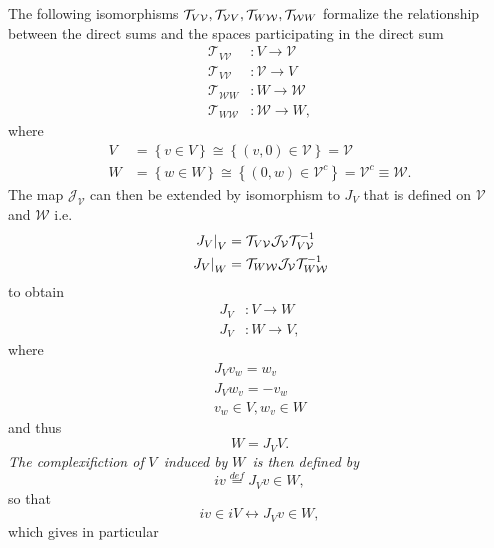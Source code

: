 \documentclass[aps,preprint]{revtex4}
\begin{document}
The following isomorphisms $\mathcal{T}_{V\mathcal{V}},\mathcal{T}_{\mathcal{%
V}V},\mathcal{T}_{W\mathcal{W}},\mathcal{T}_{\mathcal{W}W}$ formalize the
relationship between the direct sums and the spaces participating in the
direct sum 
\begin{align}
\mathcal{T}_{V\mathcal{V}} & :V\rightarrow\mathcal{V} \\
\mathcal{T}_{V\mathcal{V}} & :\mathcal{V}\rightarrow V \\
\mathcal{T}_{\mathcal{W}W} & :W\rightarrow\mathcal{W} \\
\mathcal{T}_{W\mathcal{W}} & :\mathcal{W}\rightarrow W,
\end{align}
where%
\begin{align}
V & =\left\{ v\in V\right\} \cong\left\{ \left( v,0\right) \in\mathcal{V}%
\right\} =\mathcal{V} \\
W & =\left\{ w\in W\right\} \cong\left\{ \left( 0,w\right) \in\mathcal{V}%
^{c}\right\} =\mathcal{V}^{c}\equiv\mathcal{W}.
\end{align}
The map $\mathcal{J}_{\mathcal{V}}$ can then be extended by isomorphism to $%
J_{V}$ that is defined on $\mathcal{V}$ and $\mathcal{W}$ i.e. 
\begin{align}
\left. J_{V}\right\vert _{V} & =\mathcal{T}_{V\mathcal{V}}\mathcal{J}_{%
\mathcal{V}}\mathcal{T}_{V\mathcal{V}}^{-1} \\
\left. J_{V}\right\vert _{W} & =\mathcal{T}_{W\mathcal{W}}\mathcal{J}_{%
\mathcal{V}}\mathcal{T}_{W\mathcal{W}}^{-1}
\end{align}
to obtain 
\begin{align}
J_{V} & :V\rightarrow W \\
J_{V} & :W\rightarrow V,
\end{align}
where 
\begin{gather}
J_{V}v_{w}=w_{v} \\
J_{V}w_{v}=-v_{w} \\
v_{w}\in V,w_{v}\in W
\end{gather}
and thus 
\begin{equation}
W=J_{V}V.
\end{equation}
\emph{The complexifiction of }$V$\emph{\ induced by }$W$\emph{\ is then
defined by} 
\begin{equation}
iv\overset{def}{=}J_{V}v\in W,
\end{equation}
so that 
\begin{equation}
iv\in iV\leftrightarrow J_{V}v\in W,
\end{equation}
which gives in particular%
\end{document}
